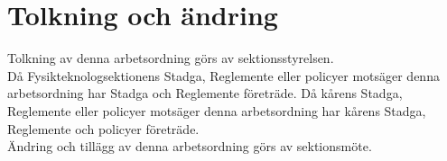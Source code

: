 \section{Tolkning och ändring}
Tolkning av denna arbetsordning görs av sektionsstyrelsen.\\ Då Fysikteknologsektionens Stadga, Reglemente eller policyer motsäger denna arbetsordning har Stadga och Reglemente företräde. Då kårens Stadga, Reglemente eller policyer motsäger denna arbetsordning har kårens Stadga, Reglemente och policyer företräde.\\
Ändring och tillägg av denna arbetsordning görs av sektionsmöte.

\newpage